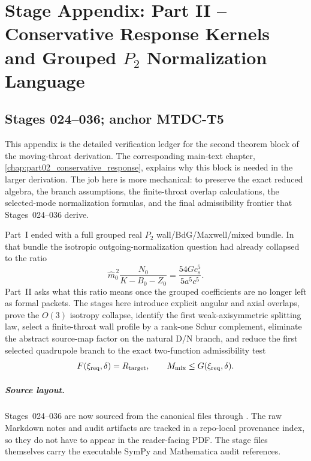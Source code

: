 \chapter{Stage Appendix: Part II -- Conservative Response Kernels and Grouped \texorpdfstring{$P_2$}{P2} Normalization Language}
\label{app:stage-part-2}

\section*{Stages 024--036; anchor MTDC-T5}

This appendix is the detailed verification ledger for the second theorem block of the moving-throat derivation.  The corresponding main-text chapter, \cref{chap:part02_conservative_response}, explains why this block is needed in the larger derivation.  The job here is more mechanical: to preserve the exact reduced algebra, the branch assumptions, the finite-throat overlap calculations, the selected-mode normalization formulas, and the final admissibility frontier that Stages~024--036 derive.

Part~I ended with a full grouped real \(P_2\) wall/BdG/Maxwell/mixed bundle.  In that bundle the isotropic outgoing-normalization question had already collapsed to the ratio
\begin{equation}
\label{eq:app-part02-entry-ratio}
\widehat m_0^{\,2}\frac{N_0}{K-B_0-Z_0}
=
\frac{54G c_s^5}{5a^5c^5}.
\end{equation}
Part~II asks what this ratio means once the grouped coefficients are no longer left as formal packets.  The stages here introduce explicit angular and axial overlaps, prove the \(O(3)\) isotropy collapse, identify the first weak-axisymmetric splitting law, select a finite-throat wall profile by a rank-one Schur complement, eliminate the abstract source-map factor on the natural D/N branch, and reduce the first selected quadrupole branch to the exact two-function admissibility test
\begin{equation}
\label{eq:app-part02-final-FG-preview}
F(\xi_{\rm req},\delta)=R_{\rm target},
\qquad
M_{\rm mix}\leq G(\xi_{\rm req},\delta).
\end{equation}


\paragraph{Source layout.}
Stages~024--036 are now sourced from the canonical files  through .  The raw Markdown notes and audit artifacts are tracked in a repo-local provenance index, so they do not have to appear in the reader-facing PDF.  The stage files themselves carry the executable SymPy and Mathematica audit references.

